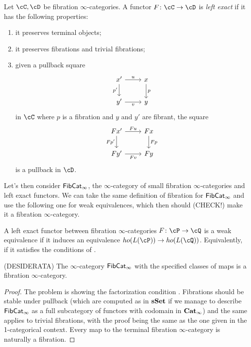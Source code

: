 \documentclass[a4paper,12pt]{scrartcl}
\begin{document}
\begin{defn}
  Let $\cC,\cD$ be fibration $\infty$-categories. A functor
  $F\colon\cC\rightarrow\cD$ is \emph{left exact} if it has the following
  properties:
  \begin{enumerate}
    \item it preserves terminal objects;
    \item it preserves fibrations and trivial fibrations;
    \item given a pullback square
      \[\begin{tikzcd}
        {x'} & x \\
        {y'} & y
        \arrow["p", from=1-2, to=2-2]
        \arrow["{p'}"', from=1-1, to=2-1]
        \arrow["v"', from=2-1, to=2-2]
        \arrow["u", from=1-1, to=1-2]
      \end{tikzcd}\]
      in $\cC$ where $p$ is a fibration and $y$ and $y'$ are fibrant, the square
      \[\begin{tikzcd}
        {Fx'} & Fx \\
        {Fy'} & Fy
        \arrow["Fp", from=1-2, to=2-2]
        \arrow["{Fp'}"', from=1-1, to=2-1]
        \arrow["Fv"', from=2-1, to=2-2]
        \arrow["Fu", from=1-1, to=1-2]
      \end{tikzcd}\]
      is a pullback in $\cD$.
  \end{enumerate}
\end{defn}

Let's then consider $\operatorname{\mathsf{FibCat}}_\infty$, the $\infty$-category of small fibration
$\infty$-categories and left exact functors. We can take the same definition of
fibration for $\operatorname{\mathsf{FibCat}}_\infty$ and use the following one for weak equivalences, which then should (CHECK!)
make it a fibration $\infty$-category.

\begin{defn}
    A left exact functor between fibration $\infty$-categories
    $F\colon\cP\rightarrow\cQ$ is a weak equivalence if it induces an
    equivalence $ho(L(\cP))\rightarrow ho(L(\cQ))$. Equivalently, if it
    satisfies the conditions of \cite[Thm. 7.6.15]{Cis19}.
\end{defn}

\begin{prop}
  (DESIDERATA) The $\infty$-category $\operatorname{\mathsf{FibCat}}_\infty$ with the specified classes
  of maps is a fibration $\infty$-category.
\end{prop}
\begin{proof}
  The problem is showing the factorization condition . Fibrations
  should be stable under pullback (which are computed as in $\operatorname{\mathbf{sSet}}$ if we manage
  to describe $\operatorname{\mathsf{FibCat}}_\infty$ as a full subcategory of functors with codomain
  in $\operatorname{\mathbf{Cat}}_\infty$) and the same applies to trivial fibrations, with the proof
  being the same as the one given in the 1-categorical context. Every map to the
  terminal fibration $\infty$-category is naturally a fibration.
\end{proof}
\end{document}
